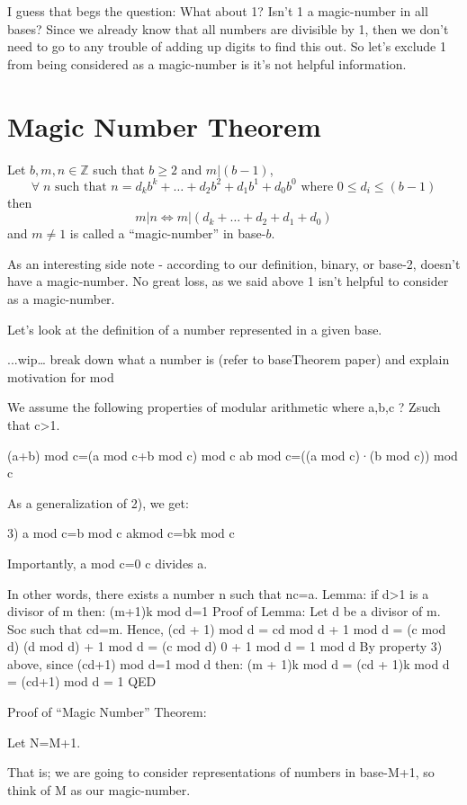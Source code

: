 \documentclass{article}
\newenvironment{jprIn}{\begin{adjustwidth}{2em}{}}{\end{adjustwidth}}
\begin{document}
I guess that begs the question: What about 1? Isn't 1 a magic-number in all bases?
Since we already know that all numbers are divisible by 1,
then we don't need to go to any trouble of adding up digits to find this out.
So let's exclude 1 from being considered as a magic-number is it's not helpful information.

\section*{Magic Number Theorem}
\begin{jprIn}
Let $b, m, n\in\mathbb{Z}$ such that $b\ge2$ and $m\big|(b-1)$,
\[\forall{}\;n\text{ such that }n=d_kb^k+\dots+d_2b^2+d_1b^1+d_0b^0\text{ where }0\le{}d_i\le(b-1)\]
then
\[m\big|n \Leftrightarrow m\big|(d_k+\dots+d_2+d_1+d_0)\]
and $m\ne1$ is called a ``magic-number'' in base-$b$.
\end{jprIn}
\bigskip

As an interesting side note - according to our definition, binary,
or base-2, doesn't have a magic-number.
No great loss, as we said above 1 isn't helpful to consider as a magic-number. 

Let's look at the definition of a number represented in a given base.

...wip…
break down what a number is (refer to baseTheorem paper) and explain motivation for mod

We assume the following properties of modular arithmetic where a,b,c ? Zsuch that c>1.

(a+b) mod c=(a mod c+b mod c) mod c
ab mod c=((a mod c)·(b mod c)) mod c

As a generalization of 2), we get:

3) a mod c=b mod c akmod c=bk mod c

Importantly, a mod c=0 c divides a.

In other words, there exists a number n such that nc=a.
Lemma:
if d>1 is a divisor of m then:
(m+1)k mod d=1
Proof of Lemma:
Let d be a divisor of m. Soc such that cd=m.
Hence, (cd + 1) mod d = cd mod d + 1 mod d
= (c mod d) (d mod d) + 1 mod d
= (c mod d) 0 + 1 mod d
= 1 mod d
By property 3) above, since (cd+1) mod d=1 mod d then:
(m + 1)k mod d
= (cd + 1)k mod d
= (cd+1) mod d
= 1
QED

Proof of ``Magic Number'' Theorem:

Let N=M+1.

That is; we are going to consider representations of numbers in base-M+1, so think of M as our magic-number.
\end{document}
